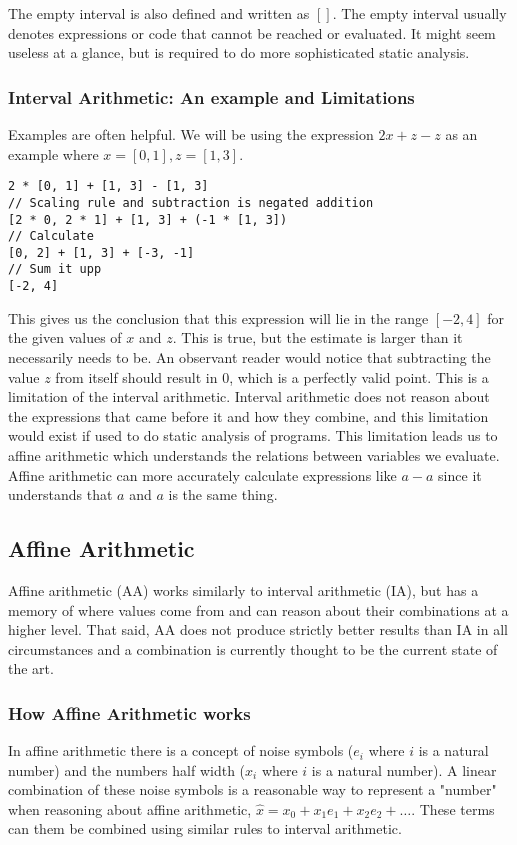 The empty interval is also defined and written as $[]$. The empty interval usually denotes expressions or code that cannot be reached or evaluated. It might seem useless at a glance, but is required to do more sophisticated static analysis.

\subsubsection{Interval Arithmetic: An example and Limitations}
Examples are often helpful.
We will be using the expression $2x + z - z$ as an example where $x = [0, 1], z = [1, 3]$.

\begin{verbatim}
2 * [0, 1] + [1, 3] - [1, 3]
// Scaling rule and subtraction is negated addition 
[2 * 0, 2 * 1] + [1, 3] + (-1 * [1, 3])
// Calculate
[0, 2] + [1, 3] + [-3, -1]
// Sum it upp
[-2, 4]
\end{verbatim}

This gives us the conclusion that this expression will lie in the range $[-2, 4]$ for the given values of $x$ and $z$. This is true, but the estimate is larger than it necessarily needs to be. An observant reader would notice that subtracting the value $z$ from itself should result in $0$, which is a perfectly valid point. This is a limitation of the interval arithmetic. Interval arithmetic does not reason about the expressions that came before it and how they combine, and this limitation would exist if used to do static analysis of programs. This limitation leads us to affine arithmetic which understands the relations between variables we evaluate. Affine arithmetic can more accurately calculate expressions like $a - a$ since it understands that $a$ and $a$ is the same thing.

\subsection{Affine Arithmetic}
Affine arithmetic (AA) works similarly to interval arithmetic (IA), but has a memory of where values come from and can reason about their combinations at a higher level. That said, AA does not produce strictly better results than IA in all circumstances and a combination is currently thought to be the current state of the art. \cite{src:affAri}

\subsubsection{How Affine Arithmetic works}
In affine arithmetic there is a concept of noise symbols ($e_i$ where $i$ is a natural number) and the numbers half width ($x_i$ where $i$ is a natural number). A linear combination of these noise symbols is a reasonable way to represent a "number" when reasoning about affine arithmetic, $\hat{x} = x_0 + x_1e_1 + x_2e_2 + \dots$. These terms can them be combined using similar rules to interval arithmetic. \cite{src:affAri}

